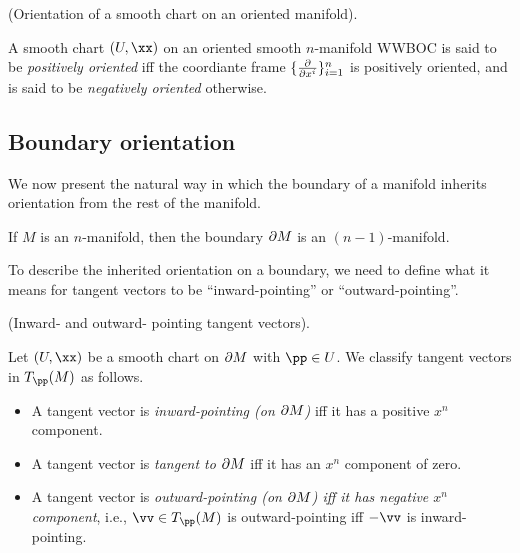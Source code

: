 \begin{defn}
\label{ch::manifolds::defn::orientation_smooth_chart}
     (Orientation of a smooth chart on an oriented manifold).
    
    A smooth chart $(U, \xx)$ on an oriented smooth $n$-manifold WWBOC is said to be \textit{positively oriented} iff the coordiante frame $\{\frac{\partial}{\partial x^i}\}_{i = 1}^n$ is positively oriented, and is said to be \textit{negatively oriented} otherwise.
\end{defn}

\subsection*{Boundary orientation}

We now present the natural way in which the boundary of a manifold inherits orientation from the rest of the manifold.

\begin{lemma}
    If $M$ is an $n$-manifold, then the boundary $\partial M$ is an $(n - 1)$-manifold. %
\end{lemma}

To describe the inherited orientation on a boundary, we need to define what it means for tangent vectors to be ``inward-pointing'' or ``outward-pointing''.

\begin{defn}
     (Inward- and outward- pointing tangent vectors).
    
    Let $(U, \xx)$ be a smooth chart on $\partial M$ with $\pp \in U$. We classify tangent vectors in $T_\pp(M)$ as follows.
    
    \begin{itemize}
        \item A tangent vector is \textit{inward-pointing (on $\partial M$)} iff it has a positive $x^n$ component.
        \item A tangent vector is \textit{tangent to $\partial M$} iff it has an $x^n$ component of zero.
        \item A tangent vector is \textit{outward-pointing (on $\partial M$) iff it has negative $x^n$ component}, i.e., $\vv \in T_\pp(M)$ is outward-pointing iff $-\vv$ is inward-pointing.
    \end{itemize}
\end{defn}

    
